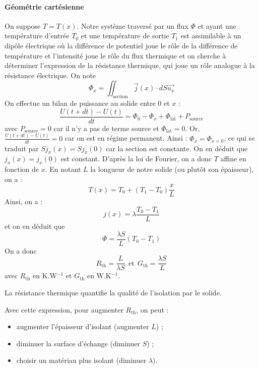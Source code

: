 \documentclass[french]{book}
\theoremstyle{plain}
\theoremstyle{definition}
\theoremstyle{remark}
\newcommand{\inv}{^{-1}}
\begin{document}
\paragraph{Géométrie cartésienne} On suppose $T=T(x)$. Notre système traversé par un flux $\Phi$ et ayant une température d'entrée $T_0$ et une température de sortie $T_1$ est assimilable à un dipôle électrique où la différence de potentiel joue le rôle de la différence de température et l'intensité joue le rôle du flux thermique et on cherche à déterminer l'expression de la résistance thermique, qui joue un rôle analogue à la résistance électrique. On note $$\Phi_x=\iint_\text{section}\overrightarrow{j}(x)\cdot dS\overrightarrow{u_x}$$ On effectue un bilan de puissance au solide entre $0$ et $x$ : $$\frac{U(t+dt)-U(t)}{dt}=\Phi_0-\Phi_{x}+\Phi_\text{lat}+P_\text{source}$$ avec $P_\text{source}=0$ car il n'y a pas de terme source et $\Phi_\text{lat}=0$. Or, $\displaystyle\frac{U(t+dt)-U(t)}{dt}=0$ car on est en régime permanent. Ainsi : $\Phi_x=\Phi_{x=0}$, ce qui se traduit par $Sj_x(x)=Sj_x(0)$ car la section est constante. On en déduit que $j_x(x)=j_x(0)$ est constant. D'après la loi de Fourier, on a donc $T$ affine en fonction de $x$.  En notant $L$ la longueur de notre solide (ou plutôt son épaisseur), on a : $$T(x)=T_0+(T_1-T_0)\frac{x}{L}$$ Ainsi, on a : $$j(x)=\lambda\frac{T_0-T_1}{L}$$ et on en déduit que $$\Phi=\frac{\lambda S}{L}(T_0-T_1)$$ On a donc $$R_\text{th}=\frac{L}{\lambda S} \ \ \text{et} \ \ G_\text{th}=\frac{\lambda S}{L}$$ avec $R_\text{th}$ en K.W$\inv$ et $G_\text{th}$ en W.K$\inv$. \\ \par La résistance thermique quantifie la qualité de l'isolation par le solide. \\ \par Avec cette expression, pour augmenter $R_\text{th}$, on peut :
\begin{itemize}
	\item augmenter l'épaisseur d'isolant (augmenter $L$) ;
	\item diminuer la surface d'échange (diminuer $S$) ;
	\item choisir un matériau plus isolant (diminuer $\lambda$).
\end{itemize}
\end{document}
